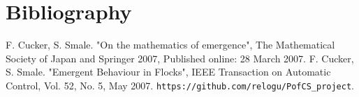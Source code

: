 \documentclass{article} %
\newcounter{math}
\begin{document}
\section{Bibliography}
\begin{thebibliography}{90}
F. Cucker, S. Smale. "On the mathematics of emergence", The Mathematical Society of Japan and Springer 2007, Published online: 28 March 2007.
F. Cucker, S. Smale. "Emergent Behaviour in Flocks", IEEE Transaction on Automatic Control, Vol. 52, No. 5, May 2007.
\verb|https://github.com/relogu/PofCS_project|.
\end{thebibliography}

\newpage
\appendix
\renewcommand\thefigure{\thesection.\arabic{figure}}
\end{document}
